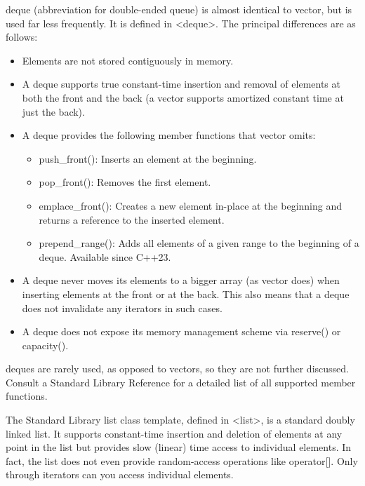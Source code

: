 
deque (abbreviation for double-ended queue) is almost identical to vector, but is used far less frequently. It is defined in <deque>. The principal differences are as follows:

\begin{itemize}
\item
Elements are not stored contiguously in memory.

\item
A deque supports true constant-time insertion and removal of elements at both the front and the back (a vector supports amortized constant time at just the back).

\item
A deque provides the following member functions that vector omits:
\begin{itemize}
\item
push\_front(): Inserts an element at the beginning.

\item
pop\_front(): Removes the first element.

\item
emplace\_front(): Creates a new element in-place at the beginning and returns a reference to the inserted element.

\item
prepend\_range(): Adds all elements of a given range to the beginning of a deque.
Available since C++23.
\end{itemize}

\item
A deque never moves its elements to a bigger array (as vector does) when inserting elements at the front or at the back. This also means that a deque does not invalidate any iterators in such cases.

\item
A deque does not expose its memory management scheme via reserve() or capacity().
\end{itemize}

deques are rarely used, as opposed to vectors, so they are not further discussed. Consult a Standard Library Reference for a detailed list of all supported member functions.


The Standard Library list class template, defined in <list>, is a standard doubly linked list. It supports constant-time insertion and deletion of elements at any point in the list but provides slow (linear) time access to individual elements. In fact, the list does not even provide random-access operations like operator[]. Only through iterators can you access individual elements.

